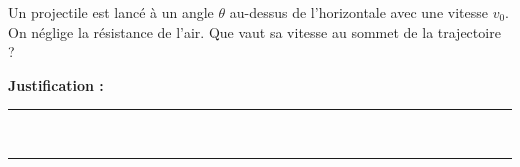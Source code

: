 Un projectile est lancé à un angle $\theta$ au-dessus de l'horizontale avec une vitesse $v_0$. On néglige la résistance de l'air. Que vaut sa vitesse au sommet de la trajectoire ?

\choices

\noindent\textbf{Justification :} \hrulefill \\[2.5ex]
\rule{\linewidth}{0.4pt} \\[2.5ex]
\rule{\linewidth}{0.4pt}
\vfill
